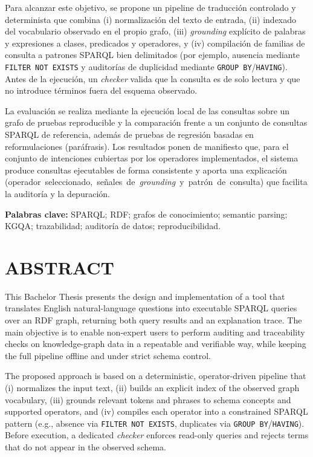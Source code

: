 \documentclass[12pt,a4paper]{article}
\begin{document}
Para alcanzar este objetivo, se propone un pipeline de traducción controlado y determinista que combina (i) normalización del texto de entrada, (ii) indexado del vocabulario observado en el propio grafo, (iii) \emph{grounding} explícito de palabras y expresiones a clases, predicados y operadores, y (iv) compilación de familias de consulta a patrones SPARQL bien delimitados (por ejemplo, ausencia mediante \texttt{FILTER NOT EXISTS} y auditorías de duplicidad mediante \texttt{GROUP BY}/\texttt{HAVING}). Antes de la ejecución, un \emph{checker} valida que la consulta es de solo lectura y que no introduce términos fuera del esquema observado.

La evaluación se realiza mediante la ejecución local de las consultas sobre un grafo de pruebas reproducible y la comparación frente a un conjunto de consultas SPARQL de referencia, además de pruebas de regresión basadas en reformulaciones (paráfrasis). Los resultados ponen de manifiesto que, para el conjunto de intenciones cubiertas por los operadores implementados, el sistema produce consultas ejecutables de forma consistente y aporta una explicación \mbox{(operador seleccionado, señales de \emph{grounding} y patrón de consulta)} que facilita la auditoría y la depuración.

\vspace{0.6cm}
\noindent\textbf{Palabras clave:} SPARQL; RDF; grafos de conocimiento; semantic parsing; KGQA; trazabilidad; auditoría de datos; reproducibilidad.

\clearpage
\thispagestyle{empty}
\null
\clearpage

\thispagestyle{plain}
\section*{ABSTRACT}
\noindent
This Bachelor Thesis presents the design and implementation of a tool that translates English natural-language questions into executable SPARQL queries over an RDF graph, returning both query results and an explanation trace. The main objective is to enable non-expert users to perform auditing and traceability checks on knowledge-graph data in a repeatable and verifiable way, while keeping the full pipeline offline and under strict schema control.

The proposed approach is based on a deterministic, operator-driven pipeline that (i) normalizes the input text, (ii) builds an explicit index of the observed graph vocabulary, (iii) grounds relevant tokens and phrases to schema concepts and supported operators, and (iv) compiles each operator into a constrained SPARQL pattern (e.g., absence via \texttt{FILTER NOT EXISTS}, duplicates via \texttt{GROUP BY}/\texttt{HAVING}). Before execution, a dedicated \emph{checker} enforces read-only queries and rejects terms that do not appear in the observed schema.
\end{document}

